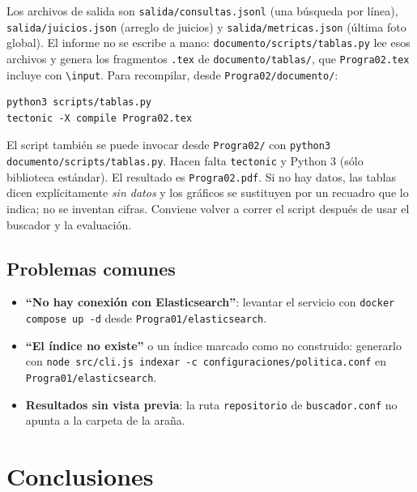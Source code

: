 \documentclass[11pt,spanish]{article}
\begin{document}
Los archivos de salida son \texttt{salida/consultas.jsonl} (una búsqueda por
línea), \texttt{salida/juicios.json} (arreglo de juicios) y
\texttt{salida/metricas.json} (última foto global). El informe no se escribe a
mano: \texttt{documento/scripts/tablas.py} lee esos archivos y genera los
fragmentos \texttt{.tex} de \texttt{documento/tablas/}, que
\texttt{Progra02.tex} incluye con \texttt{\textbackslash input}. Para
recompilar, desde \texttt{Progra02/documento/}:

\begin{lstlisting}
python3 scripts/tablas.py
tectonic -X compile Progra02.tex
\end{lstlisting}

El script también se puede invocar desde \texttt{Progra02/} con
\texttt{python3 documento/scripts/tablas.py}. Hacen falta \texttt{tectonic} y
Python 3 (sólo biblioteca estándar). El resultado es \texttt{Progra02.pdf}. Si no hay datos, las tablas dicen
explícitamente \emph{sin datos} y los gráficos se sustituyen por un recuadro que
lo indica; no se inventan cifras. Conviene volver a correr el script después de
usar el buscador y la evaluación.

\subsection{Problemas comunes}
\label{sec:problemas}

\begin{itemize}[leftmargin=1.4em,itemsep=2pt]
  \item \textbf{``No hay conexión con Elasticsearch''}: levantar el servicio con
    \texttt{docker compose up -d} desde \texttt{Progra01/elasticsearch}.
  \item \textbf{``El índice no existe''} o un índice marcado como no
    construido: generarlo con
    \texttt{node src/cli.js indexar -c configuraciones/politica.conf} en
    \texttt{Progra01/elasticsearch}.
  \item \textbf{Resultados sin vista previa}: la ruta \texttt{repositorio} de
    \texttt{buscador.conf} no apunta a la carpeta de la araña.
\end{itemize}

\section{Conclusiones}
\label{sec:conclusiones}
\end{document}
